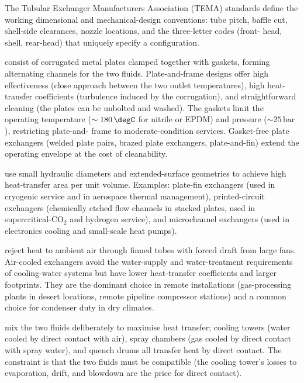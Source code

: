The Tubular Exchanger Manufacturers Association (TEMA) standards
\cite{text:tema-standards} define the working dimensional and
mechanical-design conventions: tube pitch, baffle cut, shell-side
clearances, nozzle locations, and the three-letter codes (front-
head, shell, rear-head) that uniquely specify a configuration.



 consist of corrugated metal
plates clamped together with gaskets, forming alternating channels
for the two fluids. Plate-and-frame designs offer high effectiveness
(close approach between the two outlet temperatures), high heat-
transfer coefficients (turbulence induced by the corrugation), and
straightforward cleaning (the plates can be unbolted and washed). The
gaskets limit the operating temperature ($\sim 180\,\degC$ for nitrile
or EPDM) and pressure ($\sim 25\,\text{bar}$), restricting plate-and-
frame to moderate-condition services. Gasket-free plate exchangers
(welded plate pairs, brazed plate exchangers, plate-and-fin) extend
the operating envelope at the cost of cleanability.



 use small hydraulic diameters and
extended-surface geometries to achieve high heat-transfer area per
unit volume. Examples: plate-fin exchangers (used in cryogenic
service and in aerospace thermal management), printed-circuit
exchangers (chemically etched flow channels in stacked plates, used
in supercritical-CO$_2$ and hydrogen service), and microchannel
exchangers (used in electronics cooling and small-scale heat pumps).

 reject heat to
ambient air through finned tubes with forced draft from large fans.
Air-cooled exchangers avoid the water-supply and water-treatment
requirements of cooling-water systems but have lower heat-transfer
coefficients and larger footprints. They are the dominant choice in
remote installations (gas-processing plants in desert locations,
remote pipeline compressor stations) and a common choice for
condenser duty in dry climates.

 mix the two fluids deliberately
to maximise heat transfer; cooling towers (water cooled by direct
contact with air), spray chambers (gas cooled by direct contact with
spray water), and quench drums all transfer heat by direct contact.
The constraint is that the two fluids must be compatible (the cooling
tower's losses to evaporation, drift, and blowdown are the price for
direct contact).

